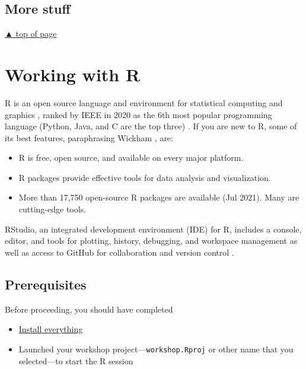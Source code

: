 \documentclass[
]{book}
\providecommand{\tightlist}{%
  \setlength{\itemsep}{0pt}\setlength{\parskip}{0pt}}
\begin{document}
\hypertarget{more-stuff-1}{%
\section{More stuff}\label{more-stuff-1}}

\protect\hyperlink{stories}{▲ top of page}

\hypertarget{work-with-R}{%
\chapter{Working with R}\label{work-with-R}}

R is an open source language and environment for statistical computing and graphics \citep{R-base}, ranked by IEEE in 2020 as the 6th most popular programming language (Python, Java, and C are the top three) \citep{Cass:2020}. If you are new to R, some of its best features, paraphrasing Wickham \citeyearpar{wickham2014advanced}, are:

\begin{itemize}
\tightlist
\item
  R is free, open source, and available on every major platform.
\item
  R packages provide effective tools for data analysis and visualization.
\item
  More than 17,750 open-source R packages are available (Jul 2021). Many are cutting-edge tools.
\end{itemize}

RStudio, an integrated development environment (IDE) for R, includes a console, editor, and tools for plotting, history, debugging, and workspace management as well as access to GitHub for collaboration and version control \citep{2016rstudio}.

\hypertarget{prerequisites}{%
\section{Prerequisites}\label{prerequisites}}

Before proceeding, you should have completed

\begin{itemize}
\tightlist
\item
  \protect\hyperlink{install-everything}{Install everything}\\
\item
  Launched your workshop project---\texttt{workshop.Rproj} or other name that you selected---to start the R session
\end{itemize}
\end{document}
